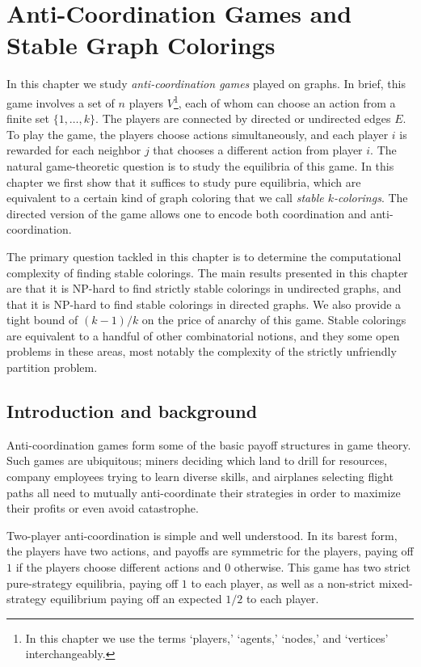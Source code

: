 \chapter{Anti-Coordination Games and Stable Graph Colorings}
\label{ch:anticoordination}

In this chapter we study \emph{anti-coordination games} played on graphs. In
brief, this game involves a set of $n$ players $V$\footnote{In this chapter we
use the terms `players,' `agents,' `nodes,' and `vertices' interchangeably.},
each of whom can choose an action from a finite set $\{1, \dots, k \}$. The
players are connected by directed or undirected edges $E$. To play the game,
the players choose actions simultaneously, and each player $i$ is rewarded for
each neighbor $j$ that chooses a different action from player $i$. The natural
game-theoretic question is to study the equilibria of this game. In this
chapter we first show that it suffices to study pure equilibria, which are
equivalent to a certain kind of graph coloring that we call \emph{stable
$k$-colorings}. The directed version of the game allows one to encode both
coordination and anti-coordination.

The primary question tackled in this chapter is to determine the computational
complexity of finding stable colorings. The main results presented in this
chapter are that it is NP-hard to find strictly stable colorings in undirected
graphs, and that it is NP-hard to find stable colorings in directed graphs. We
also provide a tight bound of $(k-1)/k$ on the price of anarchy of this game.
Stable colorings are equivalent to a handful of other combinatorial notions,
and they some open problems in these areas, most notably the complexity of the
strictly unfriendly partition problem.

\section{Introduction and background}

Anti-coordination games form some of the basic payoff structures in game
theory.  Such games are ubiquitous; miners deciding which land to drill for
resources, company employees trying to learn diverse skills, and airplanes
selecting flight paths all need to mutually anti-coordinate their strategies in
order to maximize their profits or even avoid catastrophe.

Two-player anti-coordination is simple and well understood.  In its barest
form, the players have two actions, and payoffs are symmetric for the players,
paying off $1$ if the players choose different actions and $0$ otherwise.  This
game has two strict pure-strategy equilibria, paying off $1$ to each player, as
well as a non-strict mixed-strategy equilibrium paying off an expected $1/2$ to
each player.

